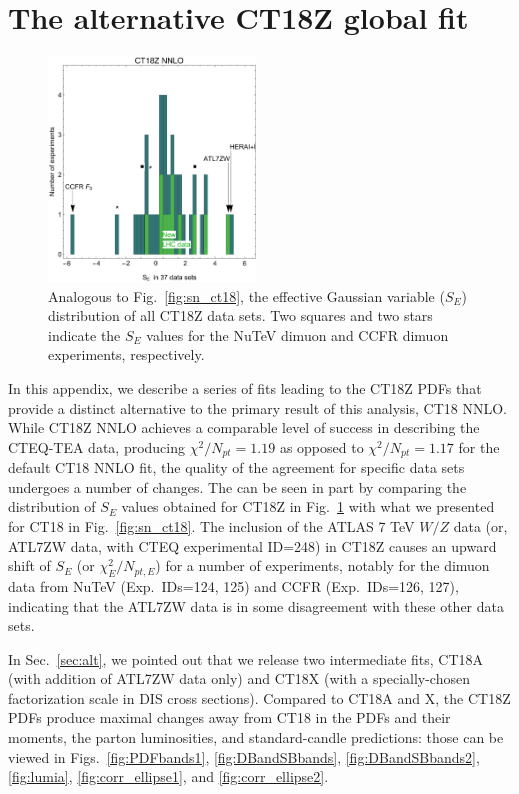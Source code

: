 \newpage
\appendix
\section{The alternative CT18Z global fit
\label{sec:AppendixCT18Z}
}
%
%

%
\begin{figure}[b]
	\includegraphics[width=0.49\textwidth]{./fig/sqrt2chi2_ct18ZnnloCount.pdf}
	\caption{Analogous to Fig.~\ref{fig:sn_ct18}, the effective Gaussian variable ($S_E$) distribution of all CT18Z data sets. Two squares and two stars indicate the $S_E$ values
	for the NuTeV dimuon and CCFR dimuon experiments, respectively.
\label{fig:sn_ct18z}}
\end{figure}

In this appendix, we describe a series of fits leading to the CT18Z PDFs that provide a distinct alternative to the primary result of this analysis, CT18 NNLO. 
While CT18Z NNLO achieves a comparable level of success in describing the CTEQ-TEA data, producing $\chi^2/N_\mathit{pt}\! =\! 1.19$ as opposed to $\chi^2/N_\mathit{pt}\! =\! 1.17$
for the default CT18 NNLO fit, the quality of the agreement for specific data sets undergoes a number of changes. The can be seen in part by comparing the distribution of $S_E$ values
obtained for CT18Z in Fig.~\ref{fig:sn_ct18z} with what we presented for CT18 in Fig.~\ref{fig:sn_ct18}.
%
The inclusion of the ATLAS 7 TeV $W/Z$ data (or, ATL7ZW data, with
CTEQ experimental ID=248) in CT18Z causes an upward shift of $S_E$ (or $\chi^2_E/N_{pt,E}$) for a number of experiments, notably for the dimuon data
from NuTeV (Exp.~IDs=124, 125) and CCFR (Exp.~IDs=126, 127), indicating that the ATL7ZW data is in some disagreement with these other data sets.

In Sec.~\ref{sec:alt}, we pointed out that we release two intermediate fits, CT18A (with addition of ATL7ZW data only) and CT18X (with a specially-chosen factorization scale in DIS cross sections).  
Compared to CT18A and X, the CT18Z PDFs produce maximal changes away from CT18 in the PDFs and their moments, the parton luminosities, and standard-candle predictions: those can be viewed in Figs.~\ref{fig:PDFbands1}, \ref{fig:DBandSBbands}, \ref{fig:DBandSBbands2}, \ref{fig:lumia}, \ref{fig:corr_ellipse1}, and \ref{fig:corr_ellipse2}.


